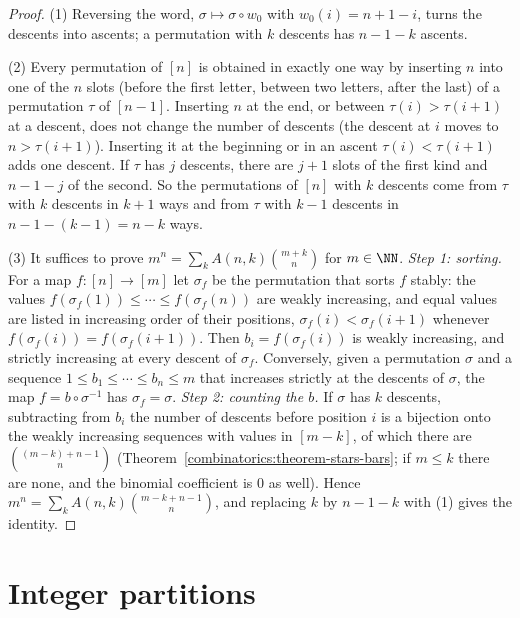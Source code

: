\begin{proof}
(1) Reversing the word, $\sigma \mapsto \sigma \circ w_0$ with $w_0(i) = n + 1 - i$, turns the descents into ascents; a permutation with $k$ descents has $n - 1 - k$ ascents.

(2) Every permutation of $[n]$ is obtained in exactly one way by inserting $n$ into one of the $n$ slots (before the first letter, between two letters, after the last) of a permutation $\tau$ of
$[n - 1]$. Inserting $n$ at the end, or between $\tau(i) > \tau(i + 1)$ at a descent, does not change the number of descents (the descent at $i$ moves to $n > \tau(i + 1)$). Inserting it at the beginning or
in an ascent $\tau(i) < \tau(i + 1)$ adds one descent. If $\tau$ has $j$ descents, there are $j + 1$ slots of the first kind and $n - 1 - j$ of the second. So the permutations of $[n]$ with $k$ descents
come from $\tau$ with $k$ descents in $k + 1$ ways and from $\tau$ with $k - 1$ descents in $n - 1 - (k - 1) = n - k$ ways.

(3) It suffices to prove $m^n = \sum_kA(n, k)\binom{m + k}{n}$ for $m \in \NN$. \emph{Step 1: sorting.} For a map $f \colon [n] \to [m]$ let $\sigma_f$ be the permutation that sorts $f$ stably: the
values $f(\sigma_f(1)) \leq \cdots \leq f(\sigma_f(n))$ are weakly increasing, and equal values are listed in increasing order of their positions, $\sigma_f(i) < \sigma_f(i + 1)$ whenever
$f(\sigma_f(i)) = f(\sigma_f(i + 1))$. Then $b_i = f(\sigma_f(i))$ is weakly increasing, and strictly increasing at every descent of $\sigma_f$. Conversely, given a permutation $\sigma$ and a sequence
$1 \leq b_1 \leq \cdots \leq b_n \leq m$ that increases strictly at the descents of $\sigma$, the map $f = b \circ \sigma^{-1}$ has $\sigma_f = \sigma$. \emph{Step 2: counting the $b$.} If $\sigma$ has $k$
descents, subtracting from $b_i$ the number of descents before position $i$ is a bijection onto the weakly increasing sequences with values in $[m - k]$, of which there are
$\binom{(m - k) + n - 1}{n}$ (Theorem~\ref{combinatorics:theorem-stars-bars}; if $m \leq k$ there are none, and the binomial coefficient is $0$ as well). Hence $m^n = \sum_kA(n, k)\binom{m - k + n - 1}{n}$, and replacing $k$ by $n - 1 - k$ with (1) gives the identity.
\end{proof}

\section{Integer partitions}\label{combinatorics:section-partitions}

